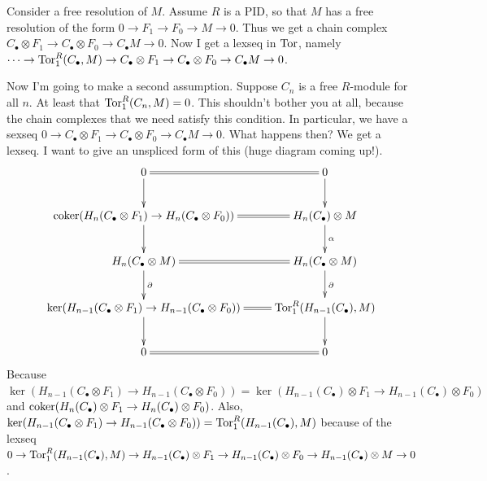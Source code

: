Consider a free resolution of $M$. Assume $R$ is a PID, so that $M$ has a free resolution of the form $0\to F_1\to F_0\to M\to 0$. Thus we get a chain complex $C_\bullet\otimes F_1\to C_\bullet\otimes F_0\to C_\bullet M\to 0$. Now I get a lexseq in $\operatorname{Tor}$, namely $\cdots\to\operatorname{Tor}^R_1(C_\bullet,M)\to C_\bullet\otimes F_1\to C_\bullet\otimes F_0\to C_\bullet M\to 0$.

Now I'm going to make a second assumption. Suppose $C_n$ is a free $R$-module for all $n$. At least that $\operatorname{Tor}^R_1(C_n,M)=0$. This shouldn't bother you at all, because the chain complexes that we need satisfy this condition. In particular, we have a sexseq $0\to C_\bullet\otimes F_1\to C_\bullet\otimes F_0\to C_\bullet M\to 0$. What happens then? We get a lexseq. I want to give an unspliced form of this (huge diagram coming up!).
\begin{equation*}
\xymatrix{0\ar[d]\ar@{=}[r] & 0\ar[d]\\
\coker( H_n(C_\bullet\otimes F_1)\to H_n(C_\bullet\otimes F_0))\ar[d]\ar@{=}[r] & H_n(C_\bullet)\otimes M\ar[d]^\alpha\\
 H_n(C_\bullet\otimes M)\ar[d]^\partial\ar@{=}[r] & H_n(C_\bullet\otimes M)\ar[d]^\partial\\
\ker( H_{n-1}(C_\bullet\otimes F_1)\to H_{n-1}(C_\bullet\otimes F_0))\ar@{=}[r]\ar[d] & \Tor^R_{1}( H_{n-1}(C_\bullet),M)\ar[d]\\
0\ar@{=}[r] & 0}
\end{equation*}
Because $\ker( H_{n-1}(C_\bullet\otimes F_1)\to H_{n-1}(C_\bullet\otimes F_0))=\ker( H_{n-1}(C_\bullet)\otimes F_1\to H_{n-1}(C_\bullet)\otimes F_0)$ and $\operatorname{coker}( H_n(C_\bullet)\otimes F_1\to H_n(C_\bullet)\otimes F_0)$. Also, $\ker( H_{n-1}(C_\bullet\otimes F_1)\to H_{n-1}(C_\bullet\otimes F_0))=\operatorname{Tor}^R_{1}( H_{n-1}(C_\bullet),M)$ because of the lexseq $0\to \operatorname{Tor}^R_1( H_{n-1}(C_\bullet),M)\to H_{n-1}(C_\bullet)\otimes F_1\to H_{n-1}(C_\bullet)\otimes F_0\to H_{n-1}(C_\bullet)\otimes M\to 0$.


